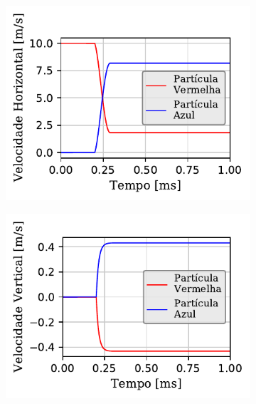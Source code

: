 \begin{figure}[htb!]
{\begin{subfigure}[t]{\smallresultsfigwidth}
			\caption{}
			\label{subfig:colliding_spheres:dissipative_rotation:y_position}
		\end{subfigure}
		\begin{subfigure}[t]{\smallresultsfigwidth}
			\centering
			\includegraphics[scale=1]{images/colliding_spheres/dissipative_rotation/Velocity-X_small.pdf}
			\caption{}
			\label{subfig:colliding_spheres:dissipative_rotation:x_velocity}
		\end{subfigure}
		\begin{subfigure}[t]{\smallresultsfigwidth}
			\centering
			\includegraphics[scale=1]{images/colliding_spheres/dissipative_rotation/Velocity-Y_small.pdf}
			\caption{}
			\label{subfig:colliding_spheres:dissipative_rotation:y_velocity}
		\end{subfigure}
}
\end{figure}
